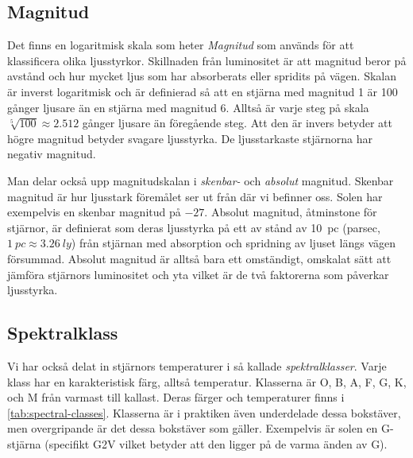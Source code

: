 \subsection{Magnitud}
Det finns en logaritmisk skala som heter \emph{Magnitud} som används för att klassificera olika ljusstyrkor. Skillnaden från luminositet är att magnitud beror på avstånd och hur mycket ljus som har absorberats eller spridits på vägen. Skalan är inverst logaritmisk och är definierad så att en stjärna med magnitud 1 är 100 gånger ljusare än en stjärna med magnitud 6. Alltså är varje steg på skala $\sqrt[5]{100} \approx \num{2.512}$ gånger ljusare än föregående steg. Att den är invers betyder att högre magnitud betyder svagare ljusstyrka. De ljusstarkaste stjärnorna har negativ magnitud.

Man delar också upp magnitudskalan i \emph{skenbar-} och \emph{absolut} magnitud. Skenbar magnitud är hur ljusstark föremålet ser ut från där vi befinner oss. Solen har exempelvis en skenbar magnitud på $-27$. Absolut magnitud, åtminstone för stjärnor, är definierat som deras ljusstyrka på ett av stånd av \qty{10}{pc} (parsec, $\qty{1}{pc}\approx \qty{3.26}{ly}$) från stjärnan med absorption och spridning av ljuset längs vägen försummad. Absolut magnitud är alltså bara ett omständigt, omskalat sätt att jämföra stjärnors luminositet och yta vilket är de två faktorerna som påverkar ljusstyrka.

\subsection{Spektralklass}
Vi har också delat in stjärnors temperaturer i så kallade \emph{spektralklasser}. Varje klass har en karakteristisk färg, alltså temperatur. Klasserna är O, B, A, F, G, K, och M från varmast till kallast. Deras färger och temperaturer finns i \cref{tab:spectral-classes}. Klasserna är i praktiken även underdelade dessa bokstäver, men overgripande är det dessa bokstäver som gäller. Exempelvis är solen en G-stjärna (specifikt G2V vilket betyder att den ligger på de varma änden av G).

